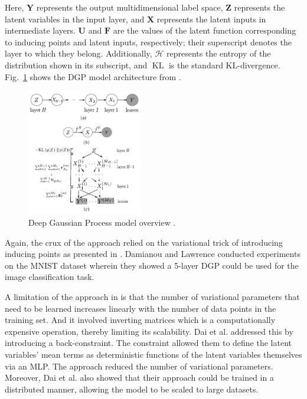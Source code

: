 \documentclass[letterpaper,11pt]{extarticle}
\begin{document}
Here, $\mathbf{Y}$ represents the output multidimensional label space, $\mathbf{Z}$ represents the latent variables in the input layer, and $\mathbf{X}$ represents the latent inputs in intermediate layers. $\mathbf{U}$ and $\mathbf{F}$ are the values of the latent function corresponding to inducing points and latent inputs, respectively; their superscript denotes the layer to which they belong. Additionally, $\mathcal{H}$ represents the entropy of the distribution shown in its subscript, and $\operatorname{KL}$ is the standard KL-divergence. Fig.~\ref{fig:dgp} shows the DGP model architecture from \cite{DamianouL13}. 

\begin{figure}[htp]
    \centering
    \includegraphics[width=0.45\textwidth]{figs/DGP.pdf}
    \caption{Deep Gaussian Process model overview \cite{DamianouL13}.}
    \label{fig:dgp}
\end{figure}

Again, the crux of the approach relied on the variational trick of introducing inducing points as presented in \cite{TitsiasL10}. Damianou and Lawrence conducted experiments on the MNIST dataset wherein they showed a 5-layer DGP could be used for the image classification task. 

A limitation of the approach in \cite{DamianouL13} is that the number of variational parameters that need to be learned increases linearly with the number of data points in the training set. And it involved inverting matrices which is a computationally expensive operation, thereby limiting its scalability. Dai et al. \cite{DaiDGL15} addressed this by introducing a back-constraint. The constraint allowed them to define the latent variables' mean terms as deterministic functions of the latent variables themselves via an MLP. The approach reduced the number of variational parameters. Moreover, Dai et al. \cite{DaiDGL15} also showed that their approach could be trained in a distributed manner, allowing the model to be scaled to large datasets.
\end{document}
